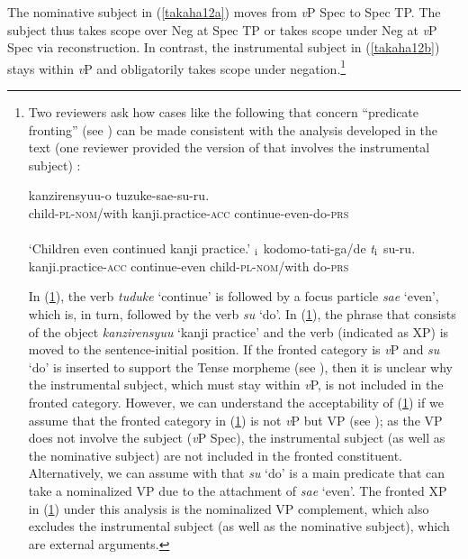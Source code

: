 \documentclass[output=paper]{langscibook}
\begin{document}
The nominative subject in (\ref{takaha12a}) moves from \emph{v}P Spec to Spec TP. The subject thus takes scope over Neg at Spec TP or takes scope under Neg at \emph{v}P Spec via reconstruction. In contrast, the instrumental subject in (\ref{takaha12b}) stays within \emph{v}P and obligatorily takes scope under negation.\footnote{
Two reviewers ask how cases like the following that concern “predicate fronting” (see \citealt{HojiTada1989}) can be made consistent with the analysis developed in the text (one reviewer provided the version of  that involves the instrumental subject) : \footnotesize 
\begin{exe}
\ex
\begin{xlist}
\ex \label{takahaia}
 	{kanzirensyuu-o}		{tuzuke-sae-su-ru}.\\
child-\textsc{pl}-\textsc{nom}/with kanji.practice-\textsc{acc} continue-even-do-\textsc{prs}\\\\
`Children even continued kanji practice.’
\ex \label{takahaib}
$_{\textnormal{i}}$ {kodomo-tati-ga/de} \emph{t}$_{\textnormal{i}}$ {su-ru}.\\
{} kanji.practice-\textsc{acc} continue-even child-\textsc{pl}-\textsc{nom}/with {} do-\textsc{prs}\\
\end{xlist}
\end{exe}
In (\ref{takahaia}), the verb \emph{tuduke} ‘continue’ is followed by a focus particle \emph{sae} ‘even’, which is, in turn, followed by the verb \emph{su} ‘do’. In (\ref{takahaib}), the phrase that consists of the object \emph{kanzirensyuu} ‘kanji practice’ and the verb (indicated as XP) is moved to the sentence-initial position. If the fronted category is \emph{v}P and \emph{su} ‘do’ is inserted to support the Tense morpheme (see \citealt{Yatsushiro1999}), then it is unclear why the instrumental subject, which must stay within \emph{v}P, is not included in the fronted category. However, we can understand the acceptability of (\ref{takahaib}) if we assume that the fronted category in (\ref{takahaib}) is not \emph{v}P but VP (see \citealt{Kitaoka2014, Funakoshi2020}); as the VP does not involve the subject (\emph{v}P Spec), the instrumental subject (as well as the nominative subject) are not included in the fronted constituent. Alternatively, we can assume with \citet{Saito2006b} that \emph{su} ‘do’ is a main predicate that can take a nominalized VP due to the attachment of \emph{sae} ‘even’. The fronted XP in (\ref{takahaib}) under this analysis is the nominalized VP complement, which also excludes the instrumental subject (as well as the nominative subject), which are external arguments.   
}
\end{document}
